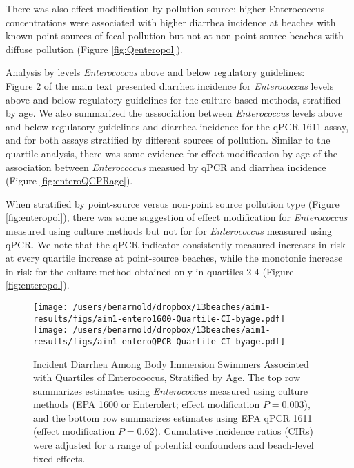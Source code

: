 \documentclass[12pt]{article}\usepackage[]{graphicx}\usepackage[]{color}
\begin{document}
There was also effect modification by pollution source: higher Enterococcus concentrations were associated with higher diarrhea incidence at beaches with known point-sources of fecal pollution but not at non-point source beaches with diffuse pollution (Figure \ref{fig:Qenteropol}).

\medskip
\noindent \underline{Analysis by levels \textit{Enterococcus} above and below regulatory guidelines}: \\
Figure 2 of the main text presented diarrhea incidence for \textit{Enterococcus} levels above and below regulatory guidelines for the culture based methods, stratified by age. We also summarized the asssociation between \emph{Enterococcus} levels above and below regulatory guidelines and diarrhea incidence for the qPCR 1611 assay, and for both assays stratified by different sources of pollution. Similar to the quartile analysis, there was some evidence for effect modification by age of the association between \textit{Enterococcus} measued by qPCR and diarrhea incidence  (Figure \ref{fig:enteroQCPRage}).  

When stratified by point-source versus non-point source pollution type (Figure \ref{fig:enteropol}), there was some suggestion of effect modification for \textit{Enterococcus} measured using culture methods but not for for \textit{Enterococcus} measured using qPCR. We note that the qPCR indicator consistently measured increases in risk at every quartile increase at point-source beaches, while the monotonic increase in risk for the culture method obtained only in quartiles 2-4 (Figure \ref{fig:enteropol}).


\begin{landscape}
\begin{figure}
\begin{center}
\texttt{[image: /users/benarnold/dropbox/13beaches/aim1-results/figs/aim1-entero1600-Quartile-CI-byage.pdf]} \\
\texttt{[image: /users/benarnold/dropbox/13beaches/aim1-results/figs/aim1-enteroQPCR-Quartile-CI-byage.pdf]}
\caption{Incident Diarrhea Among Body Immersion Swimmers Associated with Quartiles of Enterococcus, Stratified by Age. The top row summarizes estimates using \textit{Enterococcus} measured using culture methods (EPA 1600 or Enterolert; effect modification $P=0.003$), and the bottom row summarizes estimates using EPA qPCR 1611 (effect modification $P=0.62$).  Cumulative incidence ratios (CIRs) were adjusted for a range of potential confounders and beach-level fixed effects.   \label{fig:Qenteroage}}
\end{center}
\end{figure}
\end{landscape}
\end{document}
